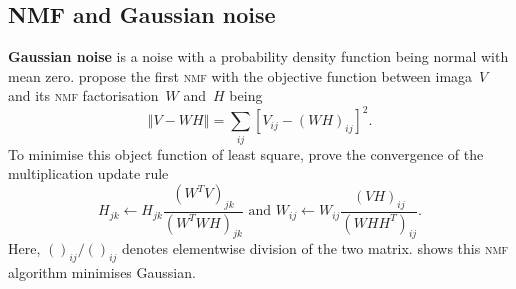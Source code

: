 \subsection{NMF and Gaussian noise}
\textbf{Gaussian noise} is a noise with a probability density function being normal with mean zero. \citet{lee2001algorithms} propose the first \textsc{nmf} with the objective function between imaga~$V$ and its \textsc{nmf} factorisation~$W$ and~$H$ being
\begin{equation}
  \left\Vert V-WH \right\Vert= \sum_{ij} \left[V_{ij}-(WH)_{ij}\right]^2.\label{eq:obnmf}
\end{equation}
To minimise this object function of least square, \citet{lee2001algorithms} prove the convergence of the multiplication update rule
\begin{equation}
H_{jk}\leftarrow H_{jk}\frac{(W^{T}V)_{jk}}{(W^{T}WH)_{jk}} \text{ and } W_{ij}\leftarrow W_{ij}\frac{(VH)_{ij}}{(WHH^{T})_{ij}}.\label{eq:nmf}
\end{equation}
Here, $()_{ij}/()_{ij}$ denotes elementwise division of the two matrix. \citet{liu2015performance} shows this \textsc{nmf} algorithm minimises Gaussian.

